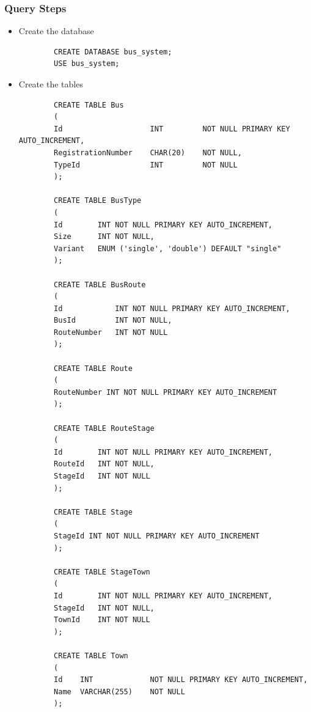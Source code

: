 \documentclass[12pt,titlepage]{article}
\begin{document}
\subsubsection*{Query Steps}

\begin{itemize}
    \item Create the database
    \begin{verbatim}
        CREATE DATABASE bus_system;
        USE bus_system;
    \end{verbatim}
    \item Create the tables
    \begin{verbatim}
        CREATE TABLE Bus 
        (
        Id                    INT         NOT NULL PRIMARY KEY AUTO_INCREMENT,
        RegistrationNumber    CHAR(20)    NOT NULL,
        TypeId                INT         NOT NULL
        );

        CREATE TABLE BusType 
        (
        Id        INT NOT NULL PRIMARY KEY AUTO_INCREMENT,
        Size      INT NOT NULL,
        Variant   ENUM ('single', 'double') DEFAULT "single"
        );

        CREATE TABLE BusRoute 
        (
        Id            INT NOT NULL PRIMARY KEY AUTO_INCREMENT,
        BusId         INT NOT NULL,
        RouteNumber   INT NOT NULL
        );

        CREATE TABLE Route 
        (
        RouteNumber INT NOT NULL PRIMARY KEY AUTO_INCREMENT
        );

        CREATE TABLE RouteStage 
        (
        Id        INT NOT NULL PRIMARY KEY AUTO_INCREMENT,
        RouteId   INT NOT NULL,
        StageId   INT NOT NULL
        );

        CREATE TABLE Stage 
        (
        StageId INT NOT NULL PRIMARY KEY AUTO_INCREMENT
        );

        CREATE TABLE StageTown 
        (
        Id        INT NOT NULL PRIMARY KEY AUTO_INCREMENT,
        StageId   INT NOT NULL,
        TownId    INT NOT NULL
        );

        CREATE TABLE Town 
        (
        Id    INT             NOT NULL PRIMARY KEY AUTO_INCREMENT,
        Name  VARCHAR(255)    NOT NULL
        );


\end{verbatim}
\end{itemize}
\end{document}
